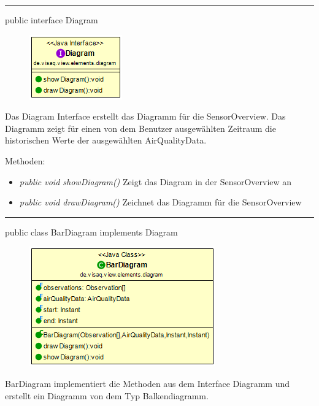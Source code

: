 

\rule{\textwidth}{0.4pt}
public interface Diagram

\begin{minipage}{0.3\textwidth}
    \begin{figure}[H]
        \includegraphics[scale = 0.7]{media/frontend/view/de.view.elements.diagram/Diagram_Class.png}
    \end{figure}
\end{minipage} \hfill
\begin{minipage}{0.6\textwidth}
Das Diagram Interface erstellt das Diagramm für die SensorOverview. Das Diagramm zeigt für einen von dem Benutzer ausgewählten Zeitraum die historischen Werte der ausgewählten AirQualityData.
\end{minipage}

Methoden:
\begin{itemize}
    \item \emph{public void showDiagram()} Zeigt das Diagram in der SensorOverview an
    \item \emph{public void drawDiagram()} Zeichnet das Diagramm für die SensorOverview
\end{itemize}

\rule{\textwidth}{0.4pt}
public class BarDiagram implements Diagram

\begin{minipage}{0.3\textwidth}
    \begin{figure}[H]
        \includegraphics[scale = 0.5]{media/frontend/view/de.view.elements.diagram/BarDiagram_Class.png}
    \end{figure}
    \end{minipage} \hfill
    \begin{minipage}{0.6\textwidth}
BarDiagram implementiert die Methoden aus dem Interface Diagramm und erstellt ein Diagramm von dem Typ Balkendiagramm.
\end{minipage}

